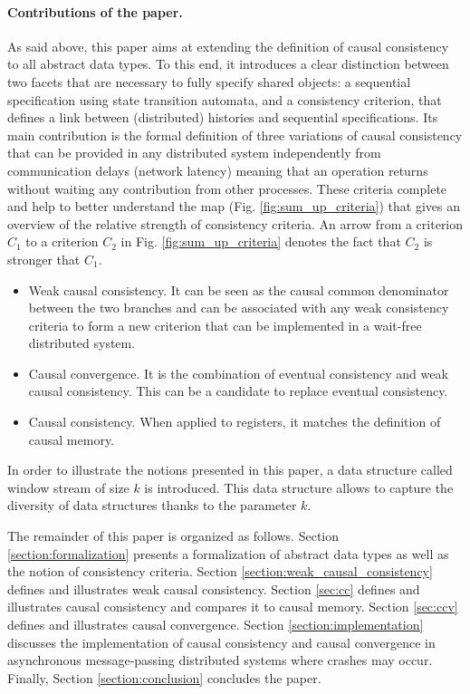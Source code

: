 \documentclass[9pt,numbers]{sigplanconf}
\begin{document}
\paragraph{Contributions of the paper.}
As said above, this paper aims at extending the definition of causal consistency to all abstract data types. 
To this end, it introduces a clear distinction between two facets that are necessary
to fully specify shared objects: a sequential specification using state transition automata, and a consistency criterion,
that defines a link between (distributed) histories and sequential specifications. 
Its main contribution is the formal definition of three variations of causal 
consistency that can be provided in any distributed system independently
from communication delays (network latency) meaning that an operation returns without waiting any contribution 
from other processes. These criteria complete and help to better understand the map (Fig. \ref{fig:sum_up_criteria}) 
that gives an overview of the relative strength of consistency
criteria.
An arrow from a criterion $C_1$ to a criterion $C_2$ in Fig. \ref{fig:sum_up_criteria} denotes the fact that $C_2$ is stronger that $C_1$.
\begin{itemize}
  \item Weak causal consistency. It can be seen as the causal common denominator between the two branches 
    and can be associated with any weak consistency criteria to form a new criterion that can be implemented 
    in a wait-free distributed system.
  \item Causal convergence. It is the combination of eventual consistency and weak causal consistency. 
    This can be a candidate to replace eventual consistency.
  \item Causal consistency. When applied to registers, it matches the definition of causal memory. 
\end{itemize}

In order to illustrate the notions presented in this paper, a data structure called window stream of size $k$ is introduced. 
This data structure allows to capture the diversity of data structures thanks to the parameter $k$.

The remainder of this paper is organized as follows. Section \ref{section:formalization}
presents a formalization of abstract data types as well as the notion of consistency criteria.
Section \ref{section:weak_causal_consistency} defines and illustrates weak causal consistency.
Section \ref{sec:cc} defines and illustrates causal consistency and compares it to causal memory.
Section \ref{sec:ccv} defines and illustrates causal convergence.
Section \ref{section:implementation} discusses the implementation of causal consistency and causal 
convergence in asynchronous message-passing distributed systems where crashes may occur.
Finally, Section \ref{section:conclusion} concludes the paper.
\end{document}
